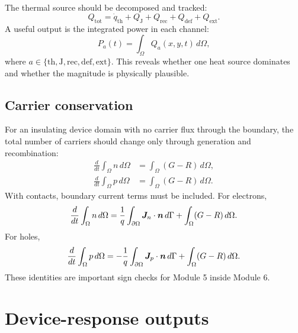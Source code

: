 \documentclass[11pt]{article}
\newcommand{\Jvec}{\bm{J}}
\newcommand{\OmegaD}{\Omega}
\begin{document}
The thermal source should be decomposed and tracked:
\begin{equation}
Q_{\mathrm{tot}}
=
\dot{q}_{\mathrm{th}}+Q_{\mathrm{J}}+Q_{\mathrm{rec}}+Q_{\mathrm{def}}+Q_{\mathrm{ext}}.
\end{equation}
A useful output is the integrated power in each channel:
\begin{equation}
P_{a}(t)=\int_{\OmegaD}Q_a(x,y,t)\,d\Omega,
\end{equation}
where \(a\in\{\mathrm{th},\mathrm{J},\mathrm{rec},\mathrm{def},\mathrm{ext}\}\). This reveals whether one heat source dominates and whether the magnitude is physically plausible.

\subsection{Carrier conservation}

For an insulating device domain with no carrier flux through the boundary, the total number of carriers should change only through generation and recombination:
\begin{align}
\frac{d}{dt}\int_{\OmegaD} n\,d\Omega &= \int_{\OmegaD}(G-R)\,d\Omega, \\
\frac{d}{dt}\int_{\OmegaD} p\,d\Omega &= \int_{\OmegaD}(G-R)\,d\Omega.
\end{align}
With contacts, boundary current terms must be included. For electrons,
\begin{equation}
\frac{d}{dt}\int_{\OmegaD} n\,d\Omega
=
\frac{1}{q}\int_{\partial\OmegaD}\Jvec_n\cdot\nvec\,d\Gamma
+
\int_{\OmegaD}(G-R)\,d\Omega.
\end{equation}
For holes,
\begin{equation}
\frac{d}{dt}\int_{\OmegaD} p\,d\Omega
=
-
\frac{1}{q}\int_{\partial\OmegaD}\Jvec_p\cdot\nvec\,d\Gamma
+
\int_{\OmegaD}(G-R)\,d\Omega.
\end{equation}
These identities are important sign checks for Module 5 inside Module 6.

\section{Device-response outputs}
\end{document}
